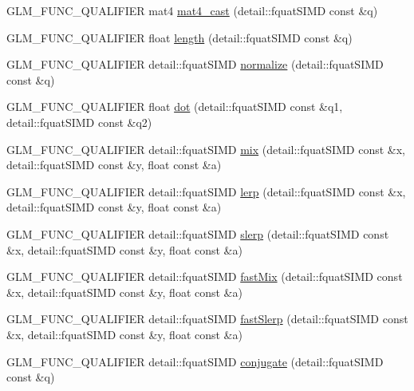 \begin{DoxyCompactItemize}
\item 
G\+L\+M\+\_\+\+F\+U\+N\+C\+\_\+\+Q\+U\+A\+L\+I\+F\+I\+E\+R mat4 \hyperlink{namespaceglm_a350adcfec63eb015dd2d9ee14a4e8cde}{mat4\+\_\+cast} (detail\+::fquat\+S\+I\+M\+D const \&q)
\item 
G\+L\+M\+\_\+\+F\+U\+N\+C\+\_\+\+Q\+U\+A\+L\+I\+F\+I\+E\+R float \hyperlink{namespaceglm_aaa8b73fac4aaa2acdfc98adc48cd15d0}{length} (detail\+::fquat\+S\+I\+M\+D const \&q)
\item 
G\+L\+M\+\_\+\+F\+U\+N\+C\+\_\+\+Q\+U\+A\+L\+I\+F\+I\+E\+R detail\+::fquat\+S\+I\+M\+D \hyperlink{namespaceglm_a31e71acc931a3619a3305958048cfa8d}{normalize} (detail\+::fquat\+S\+I\+M\+D const \&q)
\item 
G\+L\+M\+\_\+\+F\+U\+N\+C\+\_\+\+Q\+U\+A\+L\+I\+F\+I\+E\+R float \hyperlink{namespaceglm_ab68375a7ad5f9dc3db97323af1326bbb}{dot} (detail\+::fquat\+S\+I\+M\+D const \&q1, detail\+::fquat\+S\+I\+M\+D const \&q2)
\item 
G\+L\+M\+\_\+\+F\+U\+N\+C\+\_\+\+Q\+U\+A\+L\+I\+F\+I\+E\+R detail\+::fquat\+S\+I\+M\+D \hyperlink{namespaceglm_a1539ad90a9eb88f535d9dfacba04c1c9}{mix} (detail\+::fquat\+S\+I\+M\+D const \&x, detail\+::fquat\+S\+I\+M\+D const \&y, float const \&a)
\item 
G\+L\+M\+\_\+\+F\+U\+N\+C\+\_\+\+Q\+U\+A\+L\+I\+F\+I\+E\+R detail\+::fquat\+S\+I\+M\+D \hyperlink{namespaceglm_a4d8cd3fe0165431fb1c54cbeb432bf26}{lerp} (detail\+::fquat\+S\+I\+M\+D const \&x, detail\+::fquat\+S\+I\+M\+D const \&y, float const \&a)
\item 
G\+L\+M\+\_\+\+F\+U\+N\+C\+\_\+\+Q\+U\+A\+L\+I\+F\+I\+E\+R detail\+::fquat\+S\+I\+M\+D \hyperlink{namespaceglm_a40d5134f42aaa1511518d2abe97e0ebc}{slerp} (detail\+::fquat\+S\+I\+M\+D const \&x, detail\+::fquat\+S\+I\+M\+D const \&y, float const \&a)
\item 
G\+L\+M\+\_\+\+F\+U\+N\+C\+\_\+\+Q\+U\+A\+L\+I\+F\+I\+E\+R detail\+::fquat\+S\+I\+M\+D \hyperlink{namespaceglm_acf0fe775efd8a75dc6dc603efd157231}{fast\+Mix} (detail\+::fquat\+S\+I\+M\+D const \&x, detail\+::fquat\+S\+I\+M\+D const \&y, float const \&a)
\item 
G\+L\+M\+\_\+\+F\+U\+N\+C\+\_\+\+Q\+U\+A\+L\+I\+F\+I\+E\+R detail\+::fquat\+S\+I\+M\+D \hyperlink{namespaceglm_a57c9ec50932abd564671a28cd7ba53e0}{fast\+Slerp} (detail\+::fquat\+S\+I\+M\+D const \&x, detail\+::fquat\+S\+I\+M\+D const \&y, float const \&a)
\item 
G\+L\+M\+\_\+\+F\+U\+N\+C\+\_\+\+Q\+U\+A\+L\+I\+F\+I\+E\+R detail\+::fquat\+S\+I\+M\+D \hyperlink{namespaceglm_a079af2a66c2439c64053382e8c98f213}{conjugate} (detail\+::fquat\+S\+I\+M\+D const \&q)

\end{DoxyCompactItemize}
